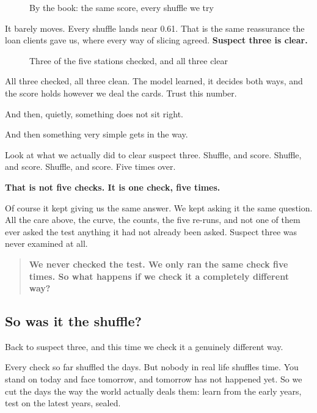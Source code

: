\documentclass[11pt]{article} %
\begin{document}
\begin{figure}[htbp]
\centering

\caption{By the book: the same score, every shuffle we try}
\end{figure}


It barely moves. Every shuffle lands near 0.61. That is the same reassurance the loan clients gave us, where every way of slicing agreed. \textbf{Suspect three is clear.}

\begin{figure}[htbp]
\centering

\caption{Three of the five stations checked, and all three clear}
\end{figure}


All three checked, all three clean. The model learned, it decides both ways, and the score holds however we deal the cards. Trust this number.

And then, quietly, something does not sit right.

And then something very simple gets in the way.

Look at what we actually did to clear suspect three. Shuffle, and score. Shuffle, and score. Shuffle, and score. Five times over.

\textbf{That is not five checks. It is one check, five times.}

Of course it kept giving us the same answer. We kept asking it the same question. All the care above, the curve, the counts, the five re-runs, and not one of them ever asked the test anything it had not already been asked. Suspect three was never examined at all.


\begin{quote}
\textbf{We never checked the test. We only ran the same check five times. So what happens if we check it a completely different way?}
\end{quote}



\subsection{So was it the shuffle?}


Back to suspect three, and this time we check it a genuinely different way.

Every check so far shuffled the days. But nobody in real life shuffles time. You stand on today and face tomorrow, and tomorrow has not happened yet. So we cut the days the way the world actually deals them: learn from the early years, test on the latest years, sealed.
\end{document}
